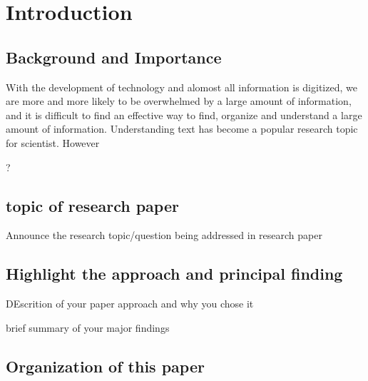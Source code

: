 \afterpage{\blankpage}

\chapter{Introduction}\label{s-intro}

\section{Background and Importance}
With the development of technology and alomost all information is digitized, we are more and more likely to be overwhelmed by a large amount of information, and it is difficult to find an effective way to find, organize and understand a large amount of information. Understanding text has become a popular research topic for scientist{\cite{intro-back}}. However

?

\section{topic of research paper}
Announce the research topic/question being addressed in research paper


\section{Highlight the approach and principal finding}

DEscrition of your paper approach and why you chose it

brief summary of your major findings

\section{Organization of this paper}
